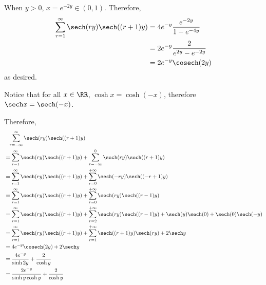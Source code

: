 \begin{enumerate}
          When \(y > 0\), \(x = e^{-2y} \in (0, 1)\). Therefore,
          \begin{align*}
              \sum_{r = 1}^{\infty} \sech (ry) \sech((r + 1)y) & = 4 e^{-y} \frac{e^{-2y}}{1 - e^{-4y}} \\
                                                               & = 2e^{-y} \frac{2}{e^{2y} - e^{-2y}}   \\
                                                               & = 2e^{-y} \cosech(2y)
          \end{align*}
          as desired.

          Notice that for all \(x \in \RR\), \(\cosh x = \cosh (-x)\), therefore \(\sech x = \sech (-x)\).

          Therefore,
          \begin{align*}
               & \phantom{=} \sum_{r = -\infty}^{\infty} \sech (ry) \sech((r + 1)y)                                                                            \\
               & = \sum_{r = 1}^{\infty} \sech (ry) \sech((r + 1)y) + \sum_{r = -\infty}^{0} \sech (ry) \sech((r + 1)y)                                        \\
               & = \sum_{r = 1}^{\infty} \sech (ry) \sech((r + 1)y) + \sum_{r = 0}^{+\infty} \sech (-ry) \sech((-r+1)y)                                        \\
               & = \sum_{r = 1}^{\infty} \sech (ry) \sech((r + 1)y) + \sum_{r = 0}^{+\infty} \sech (ry) \sech((r-1)y)                                          \\
               & = \sum_{r = 1}^{\infty} \sech (ry) \sech((r + 1)y) + \sum_{r = 2}^{+\infty} \sech (ry) \sech((r-1)y) + \sech(y) \sech(0) + \sech(0) \sech(-y) \\
               & = \sum_{r = 1}^{\infty} \sech (ry) \sech((r + 1)y) + \sum_{r = 1}^{+\infty} \sech ((r + 1)y) \sech(ry) + 2\sech y                             \\
               & = 4e^{-y} \cosech (2y) + 2 \sech y                                                                                                            \\
               & = \frac{4e^{-y}}{\sinh 2y} + \frac{2}{\cosh y}                                                                                                \\
               & = \frac{2e^{-y}}{\sinh y \cosh y} + \frac{2}{\cosh y}                                                                                         \\

\end{align*}
\end{enumerate}
